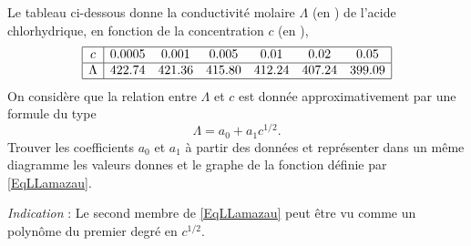 \begin{exercice}\label{exoSC_serie3-0004}

	Le tableau ci-dessous donne la conductivité molaire $\Lambda$ (en \reciprocal\ohm\centi\square\meter\per\mole) de l'acide chlorhydrique, en fonction de la concentration $c$ (en \mole\per\deci\cubic\meter),
	\[
		\begin{array}{|c|cccccc|}
			\hline
			c& 0.0005& 0.001	&0.005&0.01&	0.02	&	0.05 \\
			\hline
			\Lambda&   422.74 & 421.36 & 415.80 & 412.24 & 407.24 & 399.09  \\
			\hline
		\end{array}
	\]
	On considère que la relation entre $\Lambda$ et $c$ est donnée approximativement par une formule du type
	\begin{equation}	\label{EqLLamazau}
		\Lambda=a_0+a_1c^{1/2}.
	\end{equation}
	Trouver les coefficients $a_0$ et $a_1$ à partir des données et représenter dans un même diagramme les valeurs donnes et le graphe de la fonction définie par \eqref{EqLLamazau}.

	\emph{Indication} : Le second membre de \eqref{EqLLamazau} peut être vu comme un polynôme du premier degré en $c^{1/2}$.

\end{exercice}
